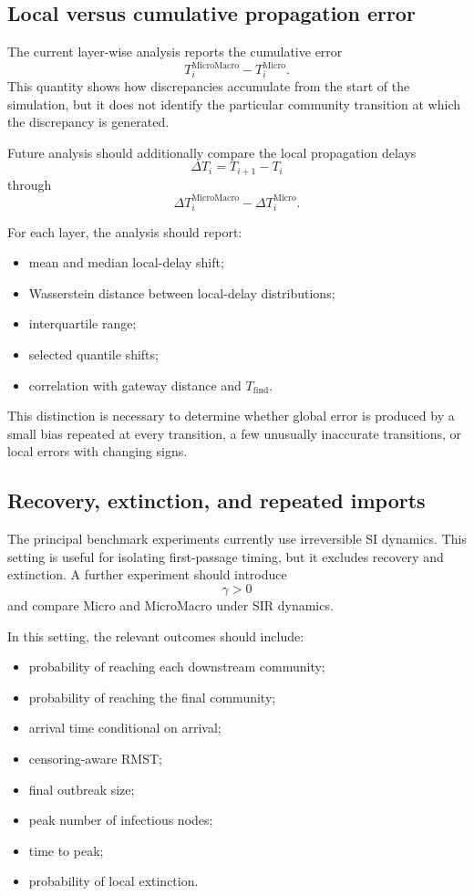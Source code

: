 \documentclass[12pt,a4paper]{article}
\begin{document}
\subsection{Local versus cumulative propagation error}

The current layer-wise analysis reports the cumulative error
\[
T_i^{\mathrm{MicroMacro}}
-
T_i^{\mathrm{Micro}}.
\]
This quantity shows how discrepancies accumulate from the start of the simulation, but it does not identify the particular community transition at which the discrepancy is generated.

Future analysis should additionally compare the local propagation delays
\[
\Delta T_i
=
T_{i+1}-T_i
\]
through
\[
\Delta T_i^{\mathrm{MicroMacro}}
-
\Delta T_i^{\mathrm{Micro}}.
\]

For each layer, the analysis should report:
\begin{itemize}
    \item mean and median local-delay shift;
    \item Wasserstein distance between local-delay distributions;
    \item interquartile range;
    \item selected quantile shifts;
    \item correlation with gateway distance and \(T_{\mathrm{find}}\).
\end{itemize}

This distinction is necessary to determine whether global error is produced by a small bias repeated at every transition, a few unusually inaccurate transitions, or local errors with changing signs.

\subsection{Recovery, extinction, and repeated imports}

The principal benchmark experiments currently use irreversible SI dynamics. This setting is useful for isolating first-passage timing, but it excludes recovery and extinction. A further experiment should introduce
\[
\gamma>0
\]
and compare Micro and MicroMacro under SIR dynamics.

In this setting, the relevant outcomes should include:
\begin{itemize}
    \item probability of reaching each downstream community;
    \item probability of reaching the final community;
    \item arrival time conditional on arrival;
    \item censoring-aware RMST;
    \item final outbreak size;
    \item peak number of infectious nodes;
    \item time to peak;
    \item probability of local extinction.
\end{itemize}
\end{document}
